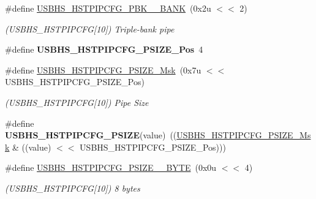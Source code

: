 \begin{DoxyCompactItemize}
\mbox{\label{group__SAMV71__USBHS_gacf2d01a41e4d6f044a24f7b44f64a1f6}} 
\#define \mbox{\hyperlink{group__SAMV71__USBHS_gacf2d01a41e4d6f044a24f7b44f64a1f6}{U\+S\+B\+H\+S\+\_\+\+H\+S\+T\+P\+I\+P\+C\+F\+G\+\_\+\+P\+B\+K\+\_\+\_\+\+B\+A\+NK}}~(0x2u $<$$<$ 2)
\begin{DoxyCompactList}\small\item\em (U\+S\+B\+H\+S\+\_\+\+H\+S\+T\+P\+I\+P\+C\+FG\mbox{[}10\mbox{]}) Triple-\/bank pipe \end{DoxyCompactList}\item 
\mbox{\label{group__SAMV71__USBHS_ga684a43caf3f329a82c19b2d39750e3ff}} 
\#define {\bfseries U\+S\+B\+H\+S\+\_\+\+H\+S\+T\+P\+I\+P\+C\+F\+G\+\_\+\+P\+S\+I\+Z\+E\+\_\+\+Pos}~4
\item 
\mbox{\label{group__SAMV71__USBHS_ga77f213ac27c22e9ca19df137d452a69f}} 
\#define \mbox{\hyperlink{group__SAMV71__USBHS_ga77f213ac27c22e9ca19df137d452a69f}{U\+S\+B\+H\+S\+\_\+\+H\+S\+T\+P\+I\+P\+C\+F\+G\+\_\+\+P\+S\+I\+Z\+E\+\_\+\+Msk}}~(0x7u $<$$<$ U\+S\+B\+H\+S\+\_\+\+H\+S\+T\+P\+I\+P\+C\+F\+G\+\_\+\+P\+S\+I\+Z\+E\+\_\+\+Pos)
\begin{DoxyCompactList}\small\item\em (U\+S\+B\+H\+S\+\_\+\+H\+S\+T\+P\+I\+P\+C\+FG\mbox{[}10\mbox{]}) Pipe Size \end{DoxyCompactList}\item 
\mbox{\label{group__SAMV71__USBHS_gac122951619bc7c68829b9d6fd843dc31}} 
\#define {\bfseries U\+S\+B\+H\+S\+\_\+\+H\+S\+T\+P\+I\+P\+C\+F\+G\+\_\+\+P\+S\+I\+ZE}(value)~((\mbox{\hyperlink{group__SAMV71__USBHS_ga77f213ac27c22e9ca19df137d452a69f}{U\+S\+B\+H\+S\+\_\+\+H\+S\+T\+P\+I\+P\+C\+F\+G\+\_\+\+P\+S\+I\+Z\+E\+\_\+\+Msk}} \& ((value) $<$$<$ U\+S\+B\+H\+S\+\_\+\+H\+S\+T\+P\+I\+P\+C\+F\+G\+\_\+\+P\+S\+I\+Z\+E\+\_\+\+Pos)))
\item 
\mbox{\label{group__SAMV71__USBHS_gaa4925e30bac220fa554147b9d58ab408}} 
\#define \mbox{\hyperlink{group__SAMV71__USBHS_gaa4925e30bac220fa554147b9d58ab408}{U\+S\+B\+H\+S\+\_\+\+H\+S\+T\+P\+I\+P\+C\+F\+G\+\_\+\+P\+S\+I\+Z\+E\+\_\+\_\+\+B\+Y\+TE}}~(0x0u $<$$<$ 4)
\begin{DoxyCompactList}\small\item\em (U\+S\+B\+H\+S\+\_\+\+H\+S\+T\+P\+I\+P\+C\+FG\mbox{[}10\mbox{]}) 8 bytes \end{DoxyCompactList}\item 

\end{DoxyCompactItemize}
